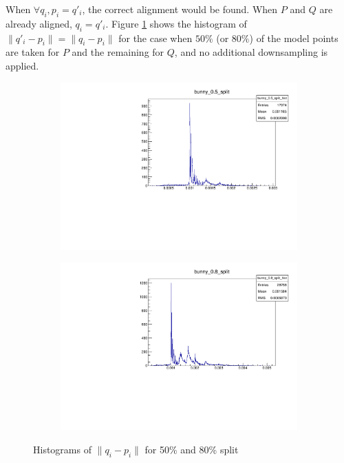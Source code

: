 When $\forall q_i, p_i = q'_i$, the correct alignment would be found. When $P$ and $Q$ are already aligned, $q_i = q'_i$. Figure \ref{fig:bunny_fexp_before} shows the histogram of $\|q'_i - p_i\| = \|q_i - p_i\|$ for the case when $50\%$ (or $80\%$) of the model points are taken for $P$ and the remaining for $Q$, and no additional downsampling is applied.

\begin{figure}[h]
\centering
\begin{subfigure}{.5\textwidth}
\includegraphics[width=\linewidth]{fig/bunny_05_split.pdf}
\end{subfigure}%
\begin{subfigure}{.5\textwidth}
\includegraphics[width=\linewidth]{fig/bunny_08_split.pdf}
\end{subfigure}
\caption{Histograms of $\|q_i - p_i\|$ for 50\% and 80\% split}
\label{fig:bunny_fexp_before}
\end{figure}

